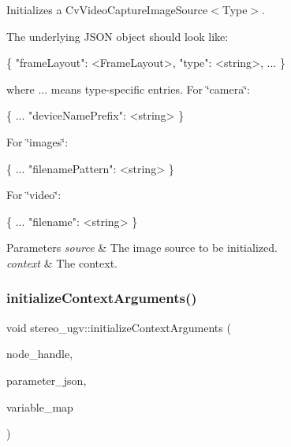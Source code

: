 Initializes a Cv\+Video\+Capture\+Image\+Source$<$\+Type$>$. 

The underlying J\+S\+ON object should look like\+: 
\begin{DoxyCode}
\{
  \textcolor{stringliteral}{"frameLayout"}: <FrameLayout>,
  \textcolor{stringliteral}{"type"}: <\textcolor{keywordtype}{string}>,
  ...
\}
\end{DoxyCode}
 where ... means type-\/specific entries. For \char`\"{}camera\char`\"{}\+: 
\begin{DoxyCode}
\{
  ...
  \textcolor{stringliteral}{"deviceNamePrefix"}: <\textcolor{keywordtype}{string}>
\}
\end{DoxyCode}
 For \char`\"{}images\char`\"{}\+: 
\begin{DoxyCode}
\{
  ...
  \textcolor{stringliteral}{"filenamePattern"}: <\textcolor{keywordtype}{string}>
\}
\end{DoxyCode}
 For \char`\"{}video\char`\"{}\+: 
\begin{DoxyCode}
\{
  ...
  \textcolor{stringliteral}{"filename"}: <\textcolor{keywordtype}{string}>
\}
\end{DoxyCode}
 
\begin{DoxyParams}{Parameters}
{\em source} & The image source to be initialized. \\
\hline
{\em context} & The context. \\
\hline
\end{DoxyParams}
\mbox{\label{namespacestereo__ugv_a68c69a3de2a5351d41ce848792c213f4}} 
\subsubsection{\texorpdfstring{initialize\+Context\+Arguments()}{initializeContextArguments()}}
{\footnotesize\ttfamily void stereo\+\_\+ugv\+::initialize\+Context\+Arguments (\begin{DoxyParamCaption}\item[{const ros\+::\+Node\+Handle \&}]{node\+\_\+handle,  }\item[{nlohmann\+::json $\ast$}]{parameter\+\_\+json,  }\item[{std\+::unordered\+\_\+map$<$ std\+::string, std\+::string $>$ $\ast$}]{variable\+\_\+map }\end{DoxyParamCaption})}



